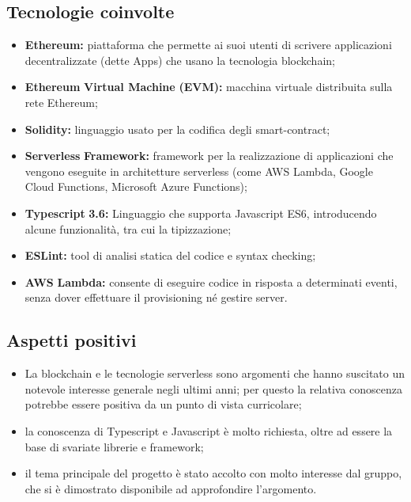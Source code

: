 \subsection{Tecnologie coinvolte}
	\begin{itemize}
		\item \textbf{Ethereum}\textbf{:} piattaforma che permette ai suoi utenti di scrivere applicazioni decentralizzate (dette \DJ Apps) che usano la tecnologia blockchain;
		\item \textbf{Ethereum} \textbf{Virtual Machine} \textbf{(EVM}\textbf{):} macchina virtuale distribuita sulla rete Ethereum; 
		\item \textbf{Solidity}\textbf{:} linguaggio usato per la codifica degli smart-contract; 
		\item \textbf{Serverless} \textbf{Framework}\textbf{:} framework per la realizzazione di applicazioni che vengono eseguite in architetture serverless (come AWS Lambda, Google Cloud Functions, Microsoft Azure Functions); 
		\item \textbf{Typescript} \textbf{3.6:} Linguaggio che supporta Javascript ES6, introducendo alcune funzionalità, tra cui la tipizzazione;
		\item \textbf{ESLint}\textbf{:} tool di analisi statica del codice e syntax checking; 
		\item \textbf{AWS} \textbf{Lambda:} consente di eseguire codice in risposta a determinati eventi, senza dover effettuare il provisioning né gestire server.
	\end{itemize}

\subsection{Aspetti positivi}
	\begin{itemize}
		\item La blockchain e le tecnologie serverless sono argomenti che hanno suscitato un notevole interesse generale negli ultimi anni; per questo la relativa conoscenza potrebbe essere positiva da un punto di vista curricolare; 
		\item la conoscenza di Typescript e Javascript è molto richiesta, oltre ad essere la base di svariate librerie e framework; 
		\item il tema principale del progetto è stato accolto con molto interesse dal gruppo, che si è dimostrato disponibile ad approfondire l'argomento. 
	\end{itemize}

